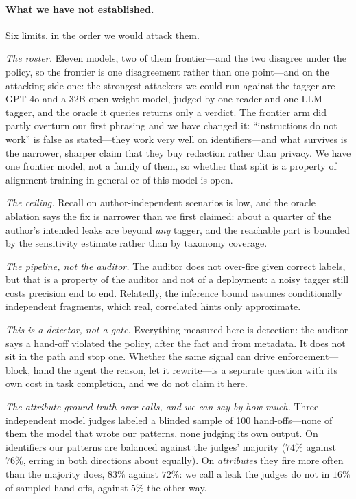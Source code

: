 \documentclass[sigconf,anonymous,review]{acmart}
\theoremstyle{acmplain}
\begin{document}
\paragraph{What we have not established.} Six limits, in the order we would attack them.

\emph{The roster.} Eleven models, two of them frontier---and the two disagree under the policy, so the frontier is one disagreement rather than one point---and on the attacking side one: the strongest attackers we could run against the tagger are GPT-4o and a 32B open-weight model, judged by one reader and one LLM tagger, and the oracle it queries returns only a verdict. The frontier arm did
partly overturn our first phrasing and we have changed it: ``instructions do not
work'' is false as stated---they work very well on identifiers---and what survives
is the narrower, sharper claim that they buy redaction rather than privacy. We have
one frontier model, not a family of them, so whether that split is a property of
alignment training in general or of this model is open.

\emph{The ceiling.} Recall on author-independent scenarios is low, and the oracle
ablation says the fix is narrower than we first claimed: about a quarter of the
author's intended leaks are beyond \emph{any} tagger, and the reachable part is
bounded by the sensitivity estimate rather than by taxonomy coverage.

\emph{The pipeline, not the auditor.} The auditor does not over-fire given correct
labels, but that is a property of the auditor and not of a deployment: a noisy
tagger still costs precision end to end. Relatedly, the inference bound assumes
conditionally independent fragments, which real, correlated hints only approximate.

\emph{This is a detector, not a gate.} Everything measured here is detection: the
auditor says a hand-off violated the policy, after the fact and from metadata. It
does not sit in the path and stop one. Whether the same signal can drive
enforcement---block, hand the agent the reason, let it rewrite---is a separate
question with its own cost in task completion, and we do not claim it here.

\emph{The attribute ground truth over-calls, and we can say by how much.} Three
independent model judges labeled a blinded sample of 100 hand-offs---none of them
the model that wrote our patterns, none judging its own output. On identifiers our
patterns are balanced against the judges' majority ($74\%$ against $76\%$, erring
in both directions about equally). On \emph{attributes} they fire more often than
the majority does, $83\%$ against $72\%$: we call a leak the judges do not in
$16\%$ of sampled hand-offs, against $5\%$ the other way.
\end{document}
